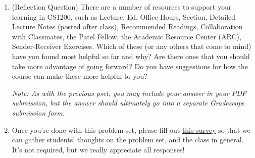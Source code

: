 \documentclass[11pt]{article}
\begin{document}
\begin{enumerate}
\begin{enumerate}
          
        \end{enumerate}

\item (Reflection Question)  There are a number of resources to support your learning in CS1200, such as Lecture, Ed, Office Hours, Section, Detailed Lecture Notes (posted after class), Recommended Readings, Collaboration with Classmates, the Patel Fellow, the Academic Resource Center (ARC), Sender-Receiver Exercises.  Which of these (or any others that come to mind) have you found most helpful so far and why?  Are there ones that you should take more advantage of going forward?  Do you have suggestions for how the course can make these more helpful to you?

\textit{Note: As with the previous pset, you may include your answer in your PDF submission, but the answer should ultimately go into a separate Gradescope submission form.}

\item Once you're done with this problem set, please fill out \href{https://forms.gle/Skby2L5TszNpSYDB6}{this survey} so that we can gather students' thoughts on the problem set, and the class in general. It's not required, but we really appreciate all responses!
\end{enumerate}
\end{document}
